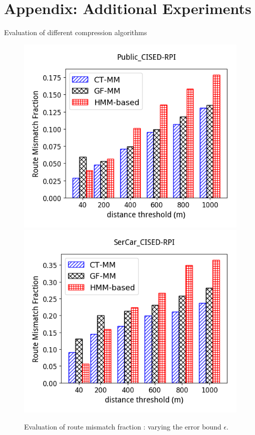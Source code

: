 \section*{Appendix: Additional Experiments}


{Evaluation of different compression algorithms}

\begin{figure}[tb!]
	\centering
  \includegraphics[height=0.3\textwidth]{Figures/Exp-epsilon-rmf-cmp_matcher_CISED-RPI-Public.png}\hspace{5ex}
  \includegraphics[height=0.3\textwidth]{Figures/Exp-epsilon-rmf-cmp_matcher_CISED-RPI-SerCar.png}\hspace{5ex}
	\vspace{-2.5ex}
  \caption{\small Evaluation of route mismatch fraction : varying the error bound $\epsilon$.}
	\label{fig:rmf-epsilon}
	\vspace{-2ex}
\end{figure}

